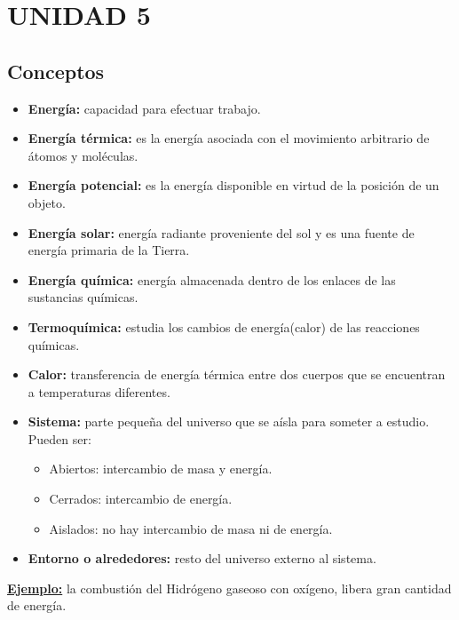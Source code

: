 \saltoPag{}
\section{UNIDAD 5}
    \subsection{Conceptos}
        \begin{itemize}
            \item \textbf{Energía:} capacidad para efectuar trabajo.
            \item \textbf{Energía térmica:} es la energía asociada con el movimiento arbitrario de átomos y moléculas.
            \item \textbf{Energía potencial:} es la energía disponible en virtud de la posición de un objeto.
            \item \textbf{Energía solar:} energía radiante proveniente del sol y es una fuente de energía primaria de la Tierra.
            \item \textbf{Energía química:} energía almacenada dentro de los enlaces de las sustancias químicas.
            \item \textbf{Termoquímica:} estudia los cambios de energía(calor) de las reacciones químicas.
        \end{itemize}
        \begin{itemize}
            \item \textbf{Calor:} transferencia de energía térmica entre dos cuerpos que se encuentran a temperaturas diferentes.
            \item \textbf{Sistema:} parte pequeña del universo que se aísla para someter a estudio. Pueden ser:
                \begin{itemize}
                    \item Abiertos: intercambio de masa y energía.
                    \item Cerrados: intercambio de energía.
                    \item Aislados: no hay intercambio de masa ni de energía.
                \end{itemize}
            \item \textbf{Entorno o alrededores:} resto del universo externo al sistema.
        \end{itemize}
        \textbf{\underline{Ejemplo:}} la combustión del Hidrógeno gaseoso con oxígeno, libera gran cantidad de energía.
